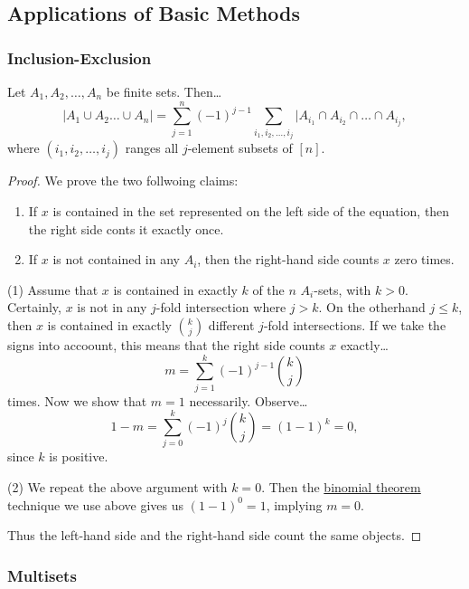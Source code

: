 \subsection{Applications of Basic Methods}\label{applicationsofbasicmethods}

\subsubsection{Inclusion-Exclusion}\label{inclusionexclusion}

\begin{theorem}
Let $A_1,A_2,\dots,A_n$ be finite sets. Then\dots
$$|A_1 \cup A_2 \dots \cup A_n| = \sum^n_{j=1}(-1)^{j-1} \sum_{i_1,i_2,\dots,i_j}|A_{i_1}\cap A_{i_2}\cap \dots \cap A_{i_j},$$
where $(i_1,i_2, \dots ,i_j)$ ranges all $j$-element subsets of $[n]$.
\end{theorem}

\begin{proof}
We prove the two follwoing claims:
\begin{enumerate}
  \item If $x$ is contained in the set represented on the left side of the equation, then the right side conts it exactly once.
  \item If $x$ is not contained in any $A_i$, then the right-hand side counts $x$ zero times.
\end{enumerate}
(1) Assume that $x$ is contained in exactly $k$ of the $n$ $A_i$-sets, with $k > 0$. Certainly, $x$ is not in any $j$-fold intersection
where $j>k$. On the otherhand $j \leq k$, then $x$ is contained in exactly ${k \choose j}$ different $j$-fold intersections. If we take
the signs into accoount, this means that the right side counts $x$ exactly\dots
$$m = \sum^k_{j=1} (-1)^{j-1} {k \choose j}$$
times. Now we show that $m=1$ necessarily. Observe\dots
$$1-m=\sum^k_{j=0}(-1)^j {k \choose j} = (1-1)^k = 0,$$
since $k$ is positive.

(2) We repeat the above argument with $k=0$. Then the \hyperref[binomialtheorem]{binomial theorem} technique we use above
gives us $(1-1)^0 = 1$, implying $m=0$.\newline

Thus the left-hand side and the right-hand side count the same objects.
\end{proof}

\subsubsection{Multisets}\label{multisets}

